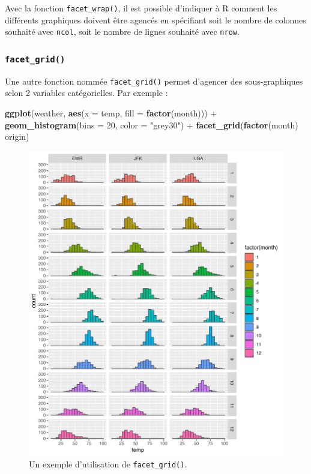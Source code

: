 \documentclass[a4paperpaper,]{article}
\newenvironment{Shaded}{\begin{snugshade}}{\end{snugshade}}
\newcommand{\DataTypeTok}[1]{\textcolor[rgb]{0.00,0.34,0.68}{#1}}
\newcommand{\DecValTok}[1]{\textcolor[rgb]{0.69,0.50,0.00}{#1}}
\newcommand{\KeywordTok}[1]{\textcolor[rgb]{0.12,0.11,0.11}{\textbf{#1}}}
\newcommand{\NormalTok}[1]{\textcolor[rgb]{0.12,0.11,0.11}{#1}}
\newcommand{\OperatorTok}[1]{\textcolor[rgb]{0.12,0.11,0.11}{#1}}
\newcommand{\StringTok}[1]{\textcolor[rgb]{0.75,0.01,0.01}{#1}}
\begin{document}
Avec la fonction \texttt{facet\_wrap()}, il est possible d'indiquer à R comment les différents graphiques doivent être agencés en spécifiant soit le nombre de colonnes souhaité avec \texttt{ncol}, soit le nombre de lignes souhaité avec \texttt{nrow}.

\hypertarget{facet_grid}{%
\subsubsection{\texorpdfstring{\texttt{facet\_grid()}}{facet\_grid()}}\label{facet_grid}}

Une autre fonction nommée \texttt{facet\_grid()} permet d'agencer des sous-graphiques selon 2 variables catégorielles. Par exemple :

\begin{Shaded}
\begin{Highlighting}[]
\KeywordTok{ggplot}\NormalTok{(weather, }\KeywordTok{aes}\NormalTok{(}\DataTypeTok{x =}\NormalTok{ temp, }\DataTypeTok{fill =} \KeywordTok{factor}\NormalTok{(month))) }\OperatorTok{+}
\StringTok{  }\KeywordTok{geom_histogram}\NormalTok{(}\DataTypeTok{bins =} \DecValTok{20}\NormalTok{, }\DataTypeTok{color =} \StringTok{"grey30"}\NormalTok{) }\OperatorTok{+}
\StringTok{  }\KeywordTok{facet_grid}\NormalTok{(}\KeywordTok{factor}\NormalTok{(month) }\OperatorTok{~}\StringTok{ }\NormalTok{origin)}
\end{Highlighting}
\end{Shaded}

\begin{figure}[htpb]

{\centering \includegraphics[width=0.9\linewidth]{figure/grid-1} 

}

\caption{Un exemple d'utilisation de \texttt{facet\_grid()}.}\label{fig:grid}
\end{figure}
\end{document}

